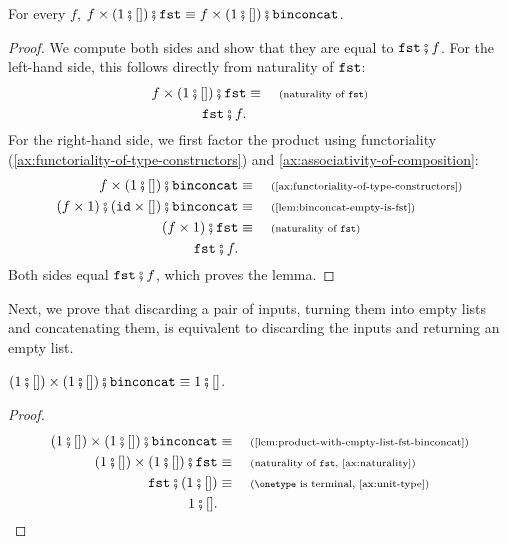 \begin{lemma}\label{lem:product-with-empty-list-fst-binconcat}
    For every $f$, $f \times (1 \comp []) \comp \fstterm \equiv f \times (1 \comp []) \comp \binconcatterm$.
\end{lemma}
\begin{proof}
    We compute both sides and show that they are equal to $\fstterm \comp f$. For the left-hand side, this follows directly from naturality of $\mathtt{fst}$:
    \begin{align*}
        f \times (1 \comp []) \comp \fstterm \equalbecause{naturality of $\fstterm$} \\
        \fstterm \comp f.
    \end{align*}
    For the right-hand side, we first factor the product using functoriality (\cref{ax:functoriality-of-type-constructors}) and \cref{ax:associativity-of-composition}:
    \begin{align*}
        f \times (1 \comp []) \comp \binconcatterm \equalbecause{\cref{ax:functoriality-of-type-constructors}} \\
        (f \times 1) \comp (\idterm \times []) \comp \binconcatterm \equalbecause{\cref{lem:binconcat-empty-is-fst}} \\
        (f \times 1) \comp \fstterm \equalbecause{naturality of $\fstterm$} \\
        \fstterm \comp f.
    \end{align*}
    Both sides equal $\fstterm \comp f$, which proves the lemma.
\end{proof}

Next, we prove that discarding a pair of inputs, turning them into empty lists and concatenating them, is equivalent to discarding the inputs and returning an empty list.

\begin{lemma}\label{lem:discarding-pair-to-empty-list}
    $(1 \comp []) \times (1 \comp []) \comp \binconcatterm \equiv 1 \comp []$.
\end{lemma} 
\begin{proof}
    \begin{align*}
        (1 \comp []) \times (1 \comp []) \comp \binconcatterm \equalbecause{\cref{lem:product-with-empty-list-fst-binconcat}} \\
        (1 \comp []) \times (1 \comp []) \comp \fstterm \equalbecause{naturality of $\fstterm$, \cref{ax:naturality}} \\
        \fstterm \comp (1 \comp []) \equalbecause{$\onetype$ is terminal, \cref{ax:unit-type}} \\
        1 \comp [].
    \end{align*}
\end{proof}

